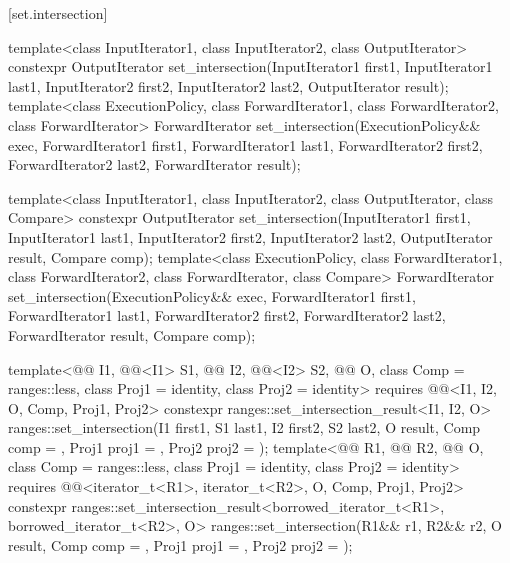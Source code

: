 [set.intersection]{}

%
\begin{itemdecl}
template<class InputIterator1, class InputIterator2,
         class OutputIterator>
  constexpr OutputIterator
    set_intersection(InputIterator1 first1, InputIterator1 last1,
                     InputIterator2 first2, InputIterator2 last2,
                     OutputIterator result);
template<class ExecutionPolicy, class ForwardIterator1, class ForwardIterator2,
         class ForwardIterator>
  ForwardIterator
    set_intersection(ExecutionPolicy&& exec,
                     ForwardIterator1 first1, ForwardIterator1 last1,
                     ForwardIterator2 first2, ForwardIterator2 last2,
                     ForwardIterator result);

template<class InputIterator1, class InputIterator2,
         class OutputIterator, class Compare>
  constexpr OutputIterator
    set_intersection(InputIterator1 first1, InputIterator1 last1,
                     InputIterator2 first2, InputIterator2 last2,
                     OutputIterator result, Compare comp);
template<class ExecutionPolicy, class ForwardIterator1, class ForwardIterator2,
         class ForwardIterator, class Compare>
  ForwardIterator
    set_intersection(ExecutionPolicy&& exec,
                     ForwardIterator1 first1, ForwardIterator1 last1,
                     ForwardIterator2 first2, ForwardIterator2 last2,
                     ForwardIterator result, Compare comp);

template<@@ I1, @@<I1> S1, @@ I2, @@<I2> S2,
         @@ O, class Comp = ranges::less,
         class Proj1 = identity, class Proj2 = identity>
  requires @@<I1, I2, O, Comp, Proj1, Proj2>
  constexpr ranges::set_intersection_result<I1, I2, O>
    ranges::set_intersection(I1 first1, S1 last1, I2 first2, S2 last2, O result,
                             Comp comp = {}, Proj1 proj1 = {}, Proj2 proj2 = {});
template<@@ R1, @@ R2, @@ O,
         class Comp = ranges::less, class Proj1 = identity, class Proj2 = identity>
  requires @@<iterator_t<R1>, iterator_t<R2>, O, Comp, Proj1, Proj2>
  constexpr ranges::set_intersection_result<borrowed_iterator_t<R1>, borrowed_iterator_t<R2>, O>
    ranges::set_intersection(R1&& r1, R2&& r2, O result,
                             Comp comp = {}, Proj1 proj1 = {}, Proj2 proj2 = {});


\end{itemdecl}
